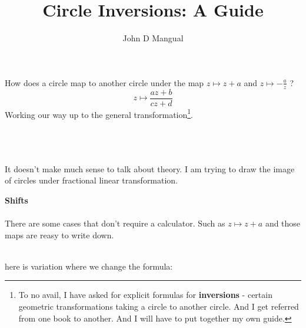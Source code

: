 \documentclass[12pt]{article}
\title{\textbf{ Circle Inversions: A Guide}}
\author{John D Mangual}
\date{}
\begin{document}
\selectfont \fontsize{25}{30}\selectfont

\maketitle

\noindent How does a circle map to another circle under the map $z \mapsto z + a$ and $z \mapsto - \frac{a}{z}$ ? 
$$ z \mapsto \frac{az+b}{cz+d}$$
Working our way up to the general transformation\footnote{To no avail, I have asked for explicit formulas for \textbf{inversions} - certain geometric transformations taking a circle to another circle.  And I get referred from one book to another.  And I will have to put together my own guide. }. \\ \\
 \\ \\
It doesn't make much sense to talk about theory.  I am trying to draw the image of circles under fractional linear transformation.

\newpage 
 
\noindent \textbf{Shifts} \\ \\
There are some cases that don't require a calculator. Such as $z \mapsto z + a$ and those maps are reasy to write down.

  \\
here is variation where we change the formula:
\end{document}

